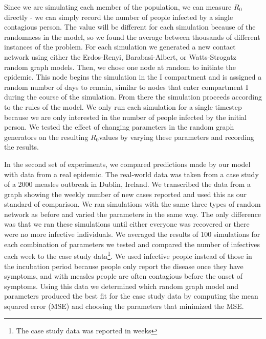 \documentclass[conference]{IEEEtran}
\newcommand{\ro}{$R_0$}
\begin{document}
Since we are simulating each member of the population, we can measure \ro directly - we can simply record the number of people infected by a single contagious person. The value will be different for each simulation because of the randomness in the model, so we found the average between thousands of different instances of the problem. For each simulation we generated a new contact network using either the Erdos-Renyi, Barabasi-Albert, or Watts-Strogatz random graph models. Then, we chose one node at random to initiate the epidemic. This node begins the simulation in the I compartment and is assigned a random number of days to remain, similar to nodes that enter compartment I during the course of the simulation. From there the simulation proceeds according to the rules of the model. We only run each simulation for a single timestep because we are only interested in the number of people infected by the initial person. We tested the effect of changing parameters in the random graph generators on the resulting \ro values by varying these parameters and recording the results.

In the second set of experiments, we compared predictions made by our model with data from a real epidemic. The real-world data was taken from a case study \cite{Mcbrein2003} of a 2000 measles outbreak in Dublin, Ireland. We transcribed the data from a graph showing the weekly number of new cases reported and used this as our standard of comparison. We ran simulations with the same three types of random network as before and varied the parameters in the same way. The only difference was that we ran these simulations until either everyone was recovered or there were no more infective individuals. We averaged the results of 100 simulations for each combination of parameters we tested and compared the number of infectives each week to the case study data\footnote{The case study data was reported in weeks}. We used infective people instead of those in the incubation period because people only report the disease once they have symptoms, and with measles people are often contagious before the onset of symptoms.\cite{pinkbookMeasles} Using this data we determined which random graph model and parameters produced the best fit for the case study data by computing the mean squared error (MSE) and choosing the parameters that minimized the MSE. 
\end{document}
